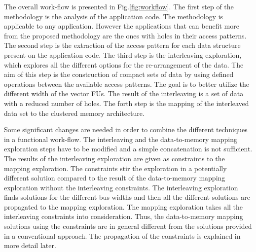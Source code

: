 \documentclass[prodmode,acmtecs]{acmsmall}
\begin{document}
The overall work-flow is presented in Fig.\ref{fig:workflow}. 
The first step of the methodology is the analysis of the application code. 
The methodology is applicable to any application.
However the applications that can benefit more from the proposed methodology are the ones with holes in their access patterns.
The second step is the extraction of the access pattern for each data structure present on the application code.
The third step is the interleaving exploration, which explores all the different options for the re-arrangement of the data.
The aim of this step is the construction of compact sets of data by using defined operations between the available access patterns.
The goal is to better utilize the different width of the vector FUs. 
The result of the interleaving is a set of data with a reduced number of holes.
The forth step is the mapping of the interleaved data set to the clustered memory architecture.

Some significant changes are needed in order to combine the different techniques in a functional work-flow.
The interleaving and the data-to-memory mapping exploration steps have to be modified and a simple concatenation is not sufficient.
The results of the interleaving exploration are given as constraints to the mapping exploration.
The constraints stir the exploration in a potentially different solution compared to the result of the data-to-memory mapping exploration without the interleaving constraints.
The interleaving exploration finds solutions for the different bus widths and then all the different solutions are propagated to the mapping exploration.
The mapping exploration takes all the interleaving constraints into consideration.
Thus, the data-to-memory mapping solutions using the constraints are in general different from the solutions provided in a conventional approach.
The propagation of the constraints is explained in more detail later. 
\end{document}
